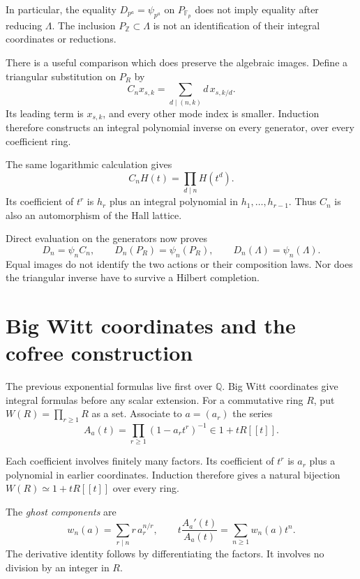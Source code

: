 In particular, the equality $D_{p^a}=\psi_{p^a}$ on
$P_{\mathbb F_p}$ does not imply equality after reducing $\Lambda$.
The inclusion $P_{\mathbb Z}\subset\Lambda$ is not an identification
of their integral coordinates or reductions.

There is a useful comparison which does preserve the algebraic images.
Define a triangular substitution on $P_R$ by
\[
 C_nx_{s,k}=\sum_{d\mid(n,k)}d\,x_{s,k/d}.
\]
Its leading term is $x_{s,k}$, and every other mode index is smaller.
Induction therefore constructs an integral polynomial inverse on
every generator, over every coefficient ring.

The same logarithmic calculation gives
\[
 C_nH(t)=\prod_{d\mid n}H(t^d).
\]
Its coefficient of $t^r$ is $h_r$ plus an integral polynomial
in $h_1,\ldots,h_{r-1}$.
Thus $C_n$ is also an automorphism of the Hall lattice.

Direct evaluation on the generators now proves
\begin{equation}
 \label{v4-arith:hecke:eq:triangular}
 D_n=\psi_nC_n,\qquad
 D_n(P_R)=\psi_n(P_R),\qquad
 D_n(\Lambda)=\psi_n(\Lambda).
\end{equation}
Equal images do not identify the two actions or their composition laws.
Nor does the triangular inverse have to survive a Hilbert completion.

\section{Big Witt coordinates and the cofree construction}
\label{v4-arith:hecke:sec:witt}

The previous exponential formulas live first over $\mathbb Q$.
Big Witt coordinates give integral formulas before any scalar extension.
For a commutative ring $R$, put $W(R)=\prod_{r\geq1}R$ as a set.
Associate to $a=(a_r)$ the series
\begin{equation}
 \label{v4-arith:hecke:eq:witt-series}
 A_a(t)=\prod_{r\geq1}(1-a_rt^r)^{-1}\in1+tR[[t]].
\end{equation}

Each coefficient involves finitely many factors.
Its coefficient of $t^r$ is $a_r$ plus a polynomial in earlier coordinates.
Induction therefore gives a natural bijection
$W(R)\simeq1+tR[[t]]$ over every ring.

The \emph{ghost components} are
\begin{equation}
 \label{v4-arith:hecke:eq:ghosts}
 w_n(a)=\sum_{r\mid n}r\,a_r^{n/r},\qquad
 t\frac{A_a'(t)}{A_a(t)}=\sum_{n\geq1}w_n(a)t^n.
\end{equation}
The derivative identity follows by differentiating the factors.
It involves no division by an integer in $R$.

